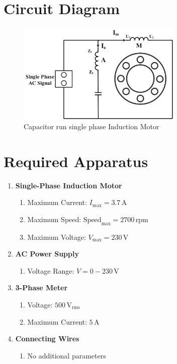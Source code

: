 \documentclass[a4paper,12pt]{article}
\begin{document}
	\section{Circuit Diagram}
	\begin{figure}[H]
		\centering
	\includegraphics[width=0.7\textwidth]{Images/1}
		\caption{Capacitor run single phase Induction Motor}
		
	\end{figure}
	
	
	
	
	\section{Required Apparatus}
	
	\begin{enumerate}
		\item \textbf{Single-Phase Induction Motor}
		\begin{enumerate}
			\item Maximum Current: \( I_{\text{max}} = 3.7\,\text{A} \)
			\item Maximum Speed: \( \text{Speed}_{\text{max}} = 2700\,\text{rpm} \)
			\item Maximum Voltage: \( V_{\text{max}} = 230\,\text{V} \)
		\end{enumerate}
		
		\item \textbf{AC Power Supply}
		\begin{enumerate}
			\item Voltage Range: \( V = 0 - 230\,\text{V} \)
		\end{enumerate}
		
		\item \textbf{3-Phase Meter}
		\begin{enumerate}
			\item Voltage: \( 500\,\text{V}_{\text{rms}} \)
			\item Maximum Current: \( 5\,\text{A} \)
		\end{enumerate}
		
		\item \textbf{Connecting Wires}
		\begin{enumerate}
			\item No additional parameters
		\end{enumerate}
	\end{enumerate}
	
\end{document}
